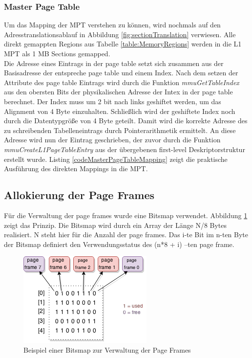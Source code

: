 \subsubsection{Master Page Table}

Um das Mapping der \ac{MPT} verstehen zu können, wird nochmals auf den Adresstranslationsablauf in Abbildung \ref{fig:sectionTranslation} verwiesen. Alle direkt gemappten Regions aus Tabelle \ref{table:MemoryRegions} werden in die L1 \ac{MPT} als 1 MB Sections gemapped.\\

Die Adresse eines Eintrags in der page table setzt sich zusammen aus der Basisadresse der entspreche page table und einem Index. Nach dem setzen der Attribute des page table Eintrags wird durch die Funktion \emph{mmuGetTableIndex} aus den obersten Bits der physikalischen Adresse der Intex in der page table berechnet. Der Index muss um 2 bit nach links geshiftet werden, um das Alignment von 4 Byte einzuhalten. Schließlich wird der geshiftete Index noch durch die Datentypgröße von 4 Byte geteilt. Damit wird die korrekte Adresse des zu schreibenden Tabelleneintrags durch Pointerarithmetik ermittelt. An diese Adresse wird nun der Eintrag geschrieben, der zuvor durch die Funktion \emph{mmuCreateL1PageTableEntry} aus der übergebenen first-level Deskriptorstruktur erstellt wurde. Listing \ref{codeMasterPageTableMapping} zeigt die praktische Ausführung des direkten Mappings in die \ac{MPT}.\\ 




\subsection{Allokierung der Page Frames}

Für die Verwaltung der page frames wurde eine Bitsmap verwendet. Abbildung \ref{fig:BitsMap} zeigt das Prinzip.
Die Bitsmap wird durch ein Array der Länge N/8 Bytes realisiert. N steht hier für die Anzahl der page frames. Das i-te Bit im n-ten Byte der Bitsmap definiert den Verwendungsstatus des (n*8 + i) –ten page frame.




\begin{figure}[H]
	\centering
	\includegraphics[scale=1]{figures/BitsMap}
	\caption{Beispiel einer Bitsmap zur Verwaltung der Page Frames}
	\label{fig:BitsMap}
\end{figure}

